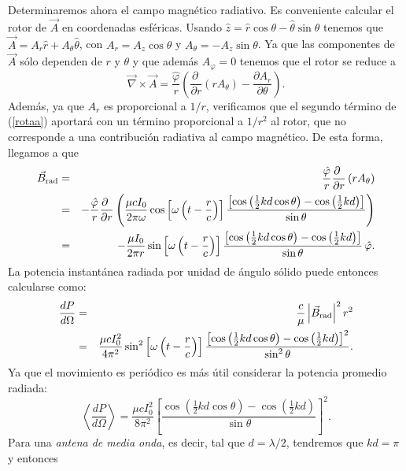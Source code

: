 Determinaremos ahora el campo magnético radiativo. Es conveniente calcular el rotor de $\vec{A}$ en coordenadas esféricas. Usando $\hat{z}=\hat{r}\cos\theta-\hat{\theta}\sin\theta$
tenemos que $\vec{A}=A_r\hat{r}+A_\theta\hat{\theta}$, con $A_r=A_z\cos\theta$ y $A_\theta=-A_z\sin\theta$. Ya que las componentes de $\vec{A}$ sólo dependen de $r$ y $\theta$ y que además $A_\varphi=0$ tenemos que el rotor se reduce a
\begin{equation}
 \vec{\nabla}\times\vec{A}=\frac{\hat{\varphi}}{r}\left(\frac{\partial\ }{\partial r}\left(rA_\theta\right)-\frac{\partial A_r}{\partial\theta}\right). \label{rotaa}
\end{equation}
Además, ya que $A_r$ es proporcional a $1/r$, verificamos que el segundo término de (\ref{rotaa}) aportará con un término proporcional a $1/r^2$ al rotor, que no corresponde a una contribución radiativa al campo magnético. De esta forma, llegamos a que
\begin{eqnarray}
 \vec{B}_{\rm rad}&=&\frac{\hat{\varphi}}{r}\frac{\partial\ }{\partial r}\left(rA_\theta\right) \\
&=&-\frac{\hat{\varphi}}{r}\frac{\partial\ }{\partial r}\left(\frac{\mu cI_0}{2\pi\omega}\cos\left[\omega\left(t-\frac{r}{c}\right)\right]\frac{\left[\cos\left(\frac{1}{2}kd\cos\theta\right)-\cos\left(\frac{1}{2}kd\right)\right]}{\sin\theta}\right) \\
&=&-\frac{\mu I_0}{2\pi r}\sin\left[\omega\left(t-\frac{r}{c}\right)\right]\frac{\left[\cos\left(\frac{1}{2}kd\cos\theta\right)-\cos\left(\frac{1}{2}kd\right)\right]}{\sin\theta}\,\hat{\varphi}.
\end{eqnarray}
La potencia instantánea radiada por unidad de ángulo sólido puede entonces calcularse como:
\begin{eqnarray}
 \frac{dP}{d\Omega}&=&\frac{c}{\mu}\left|\vec{B}_{\rm rad}\right|^2 r^2\\
&=&\frac{\mu c I_0^2}{4\pi^2}\sin^2\left[\omega\left(t-\frac{r}{c}\right)\right]\frac{\left[\cos\left(\frac{1}{2}kd\cos\theta\right)-\cos\left(\frac{1}{2}kd\right)\right]^2}{\sin^2\theta}.
\end{eqnarray}
Ya que el movimiento es periódico es más útil considerar la potencia promedio radiada:
\begin{equation}
 \left\langle\frac{dP}{d\Omega}\right\rangle=\frac{\mu cI_0^2}{8\pi^2}\left[\frac{\cos\left(\frac{1}{2}kd\cos\theta\right)-\cos\left(\frac{1}{2}kd\right)}{\sin\theta}\right]^2.
\end{equation}
Para una \textit{antena de media onda}, es decir, tal que $d=\lambda/2$, tendremos que $kd=\pi$ y entonces
